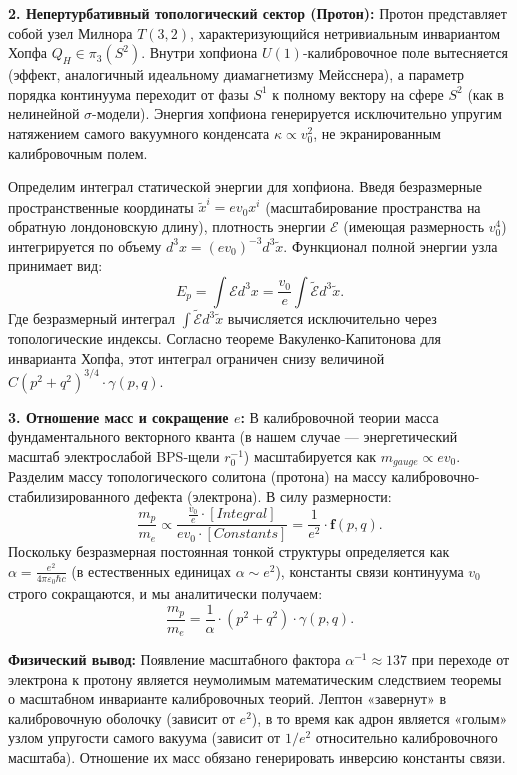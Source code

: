 \documentclass[11pt,a4paper]{article}
\begin{document}
\textbf{2. Непертурбативный топологический сектор (Протон):}
Протон представляет собой узел Милнора $T(3,2)$, характеризующийся нетривиальным инвариантом Хопфа $Q_H \in \pi_3(S^2)$. 
Внутри хопфиона $U(1)$-калибровочное поле вытесняется (эффект, аналогичный идеальному диамагнетизму Мейсснера), а параметр порядка континуума переходит от фазы $S^1$ к полному вектору на сфере $S^2$ (как в нелинейной $\sigma$-модели). Энергия хопфиона генерируется исключительно упругим натяжением самого вакуумного конденсата $\kappa \propto v_0^2$, не экранированным калибровочным полем.

Определим интеграл статической энергии для хопфиона. Введя безразмерные пространственные координаты $\tilde{x}^i = e v_0 x^i$ (масштабирование пространства на обратную лондоновскую длину), плотность энергии $\mathcal{E}$ (имеющая размерность $v_0^4$) интегрируется по объему $d^3x = (e v_0)^{-3} d^3\tilde{x}$.
Функционал полной энергии узла принимает вид:
\begin{equation}
	E_p = \int \mathcal{E} d^3x = \frac{v_0}{e} \int \tilde{\mathcal{E}} d^3\tilde{x}.
\end{equation}
Где безразмерный интеграл $\int \tilde{\mathcal{E}} d^3\tilde{x}$ вычисляется исключительно через топологические индексы. Согласно теореме Вакуленко-Капитонова для инварианта Хопфа, этот интеграл ограничен снизу величиной $C (p^2+q^2)^{3/4} \cdot \gamma(p,q)$.

\textbf{3. Отношение масс и сокращение $e$:}
В калибровочной теории масса фундаментального векторного кванта (в нашем случае — энергетический масштаб электрослабой BPS-щели $r_0^{-1}$) масштабируется как $m_{gauge} \propto e v_0$.
Разделим массу топологического солитона (протона) на массу калибровочно-стабилизированного дефекта (электрона). В силу размерности:
\begin{equation}
	\frac{m_p}{m_e} \propto \frac{\frac{v_0}{e} \cdot [Integral]}{e v_0 \cdot [Constants]} = \frac{1}{e^2} \cdot \mathbf{f}(p,q).
\end{equation}
Поскольку безразмерная постоянная тонкой структуры определяется как $\alpha = \frac{e^2}{4\pi\varepsilon_0 \hbar c}$ (в естественных единицах $\alpha \sim e^2$), константы связи континуума $v_0$ строго сокращаются, и мы аналитически получаем:
\begin{equation}
	\frac{m_p}{m_e} = \frac{1}{\alpha} \cdot (p^2+q^2) \cdot \gamma(p,q).
\end{equation}

\textbf{Физический вывод:} Появление масштабного фактора $\alpha^{-1} \approx 137$ при переходе от электрона к протону является неумолимым математическим следствием теоремы о масштабном инварианте калибровочных теорий. Лептон «завернут» в калибровочную оболочку (зависит от $e^2$), в то время как адрон является «голым» узлом упругости самого вакуума (зависит от $1/e^2$ относительно калибровочного масштаба). Отношение их масс обязано генерировать инверсию константы связи.
\end{document}
